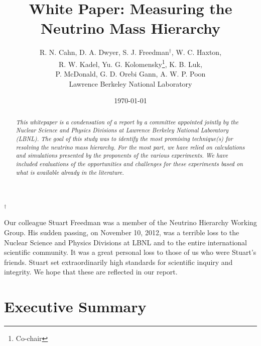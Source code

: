 \documentclass[12pt,letterpaper,amsmath,amssymb,final]{article}
\begin{document}
\title{White Paper: Measuring the Neutrino Mass Hierarchy
\vspace{1.8in}}
\author{R. N. Cahn, D. A. Dwyer, S. J. Freedman$^{\dagger}$, W. C. Haxton, \vspace{0.2in}\\
R. W. Kadel, Yu. G. Kolomensky\footnote{Co-chair}, 
K. B. Luk, \vspace{0.2in}\\
P. McDonald, G. D. Orebi Gann\footnotemark[\value{footnote}], A. W. P. Poon\vspace{0.5in}\\
Lawrence Berkeley National Laboratory}


\date{\today\vspace {1.8in}}

\maketitle
\noindent $^{\dagger}$\begin{em}{Our colleague Stuart Freedman was a member of the Neutrino Hierarchy
Working Group.  His sudden passing, on November 10, 2012, was a
terrible loss to the Nuclear Science and Physics Divisions at LBNL and
to the entire international scientific community.  It was a great personal
loss to those of us who were Stuart's friends.  Stuart set
extraordinarily high standards for scientific inquiry and integrity.
We hope that these are reflected in our report.}\end{em}
\clearpage

\begin{abstract}
\em This whitepaper is a condensation of a report by a committee
appointed jointly by the Nuclear Science and Physics Divisions at
Lawrence Berkeley National Laboratory (LBNL). The goal of this study
was to identify the most promising technique(s) for resolving the
neutrino mass hierarchy.  For the most part,  we have relied on
calculations and simulations presented by the proponents of the
various experiments.  We have included evaluations of the
opportunities and challenges for these experiments based on what is
available already in the literature. 
\end{abstract}

\setcounter{tocdepth}{2}
\tableofcontents{}

\newpage
\section{Executive Summary}

\end{document}
